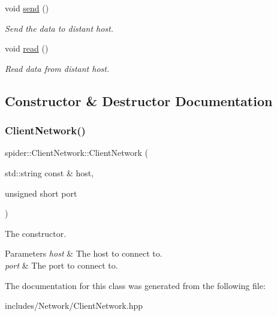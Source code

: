 \begin{DoxyCompactItemize}
\mbox{\label{classspider_1_1_client_network_ab43d94d1843e5991dd715b0bf605ee62}} 
void \hyperlink{classspider_1_1_client_network_ab43d94d1843e5991dd715b0bf605ee62}{send} ()
\begin{DoxyCompactList}\small\item\em Send the data to distant host. \end{DoxyCompactList}\item 
\mbox{\label{classspider_1_1_client_network_a3d98ad273897cc17cc2b91ada502ad35}} 
void \hyperlink{classspider_1_1_client_network_a3d98ad273897cc17cc2b91ada502ad35}{read} ()
\begin{DoxyCompactList}\small\item\em Read data from distant host. \end{DoxyCompactList}\end{DoxyCompactItemize}


\subsection{Constructor \& Destructor Documentation}
\mbox{\label{classspider_1_1_client_network_a03f8f213aa0855475d2884cdfd12cd34}} 
\subsubsection{\texorpdfstring{Client\+Network()}{ClientNetwork()}}
{\footnotesize\ttfamily spider\+::\+Client\+Network\+::\+Client\+Network (\begin{DoxyParamCaption}\item[{std\+::string const \&}]{host,  }\item[{unsigned short}]{port }\end{DoxyParamCaption})}



The constructor. 


\begin{DoxyParams}{Parameters}
{\em host} & The host to connect to. \\
\hline
{\em port} & The port to connect to. \\
\hline
\end{DoxyParams}


The documentation for this class was generated from the following file\+:\begin{DoxyCompactItemize}
\item 
includes/\+Network/Client\+Network.\+hpp\end{DoxyCompactItemize}
